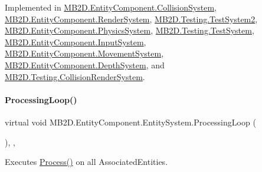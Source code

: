 Implemented in \hyperlink{class_m_b2_d_1_1_entity_component_1_1_collision_system_adfbee070ed7b120565a5f8a08c159535}{M\+B2\+D.\+Entity\+Component.\+Collision\+System}, \hyperlink{class_m_b2_d_1_1_entity_component_1_1_render_system_a015ba5b16cc227c7a5a16fcc1ffa73b7}{M\+B2\+D.\+Entity\+Component.\+Render\+System}, \hyperlink{class_m_b2_d_1_1_testing_1_1_test_system2_a0fbdd06fd0de796cfec32b7e025f73fe}{M\+B2\+D.\+Testing.\+Test\+System2}, \hyperlink{class_m_b2_d_1_1_entity_component_1_1_physics_system_ab8398d3b16f49e684f55649877f645c0}{M\+B2\+D.\+Entity\+Component.\+Physics\+System}, \hyperlink{class_m_b2_d_1_1_testing_1_1_test_system_a35d160e6e7e8ffb8f1a6cf403b00ef40}{M\+B2\+D.\+Testing.\+Test\+System}, \hyperlink{class_m_b2_d_1_1_entity_component_1_1_input_system_afa241f5c32788fc65587e0443f7217b3}{M\+B2\+D.\+Entity\+Component.\+Input\+System}, \hyperlink{class_m_b2_d_1_1_entity_component_1_1_movement_system_afa730fd9080848ce877206c00a744cdf}{M\+B2\+D.\+Entity\+Component.\+Movement\+System}, \hyperlink{class_m_b2_d_1_1_entity_component_1_1_depth_system_a738556bdf819c9c0d4082a323a502c58}{M\+B2\+D.\+Entity\+Component.\+Depth\+System}, and \hyperlink{class_m_b2_d_1_1_testing_1_1_collision_render_system_af7b7ffdb316533a084e98cbea97a096f}{M\+B2\+D.\+Testing.\+Collision\+Render\+System}.

\hypertarget{class_m_b2_d_1_1_entity_component_1_1_entity_system_a75552787342e68c427bf2e1ffa60ed6c}{}\label{class_m_b2_d_1_1_entity_component_1_1_entity_system_a75552787342e68c427bf2e1ffa60ed6c} 
\paragraph{\texorpdfstring{Processing\+Loop()}{ProcessingLoop()}}
{\footnotesize\ttfamily virtual void M\+B2\+D.\+Entity\+Component.\+Entity\+System.\+Processing\+Loop (\begin{DoxyParamCaption}{ }\end{DoxyParamCaption})\hspace{0.3cm}{\ttfamily [inline]}, {\ttfamily [protected]}, {\ttfamily [virtual]}}



Executes \hyperlink{class_m_b2_d_1_1_entity_component_1_1_entity_system_abbf83b87cb5d12754fb058cef50451fa}{Process()} on all Associated\+Entities. 



